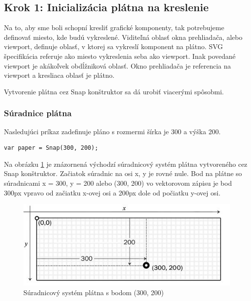  
\subsection{Krok 1: Inicializácia plátna na kreslenie}
Na to, aby sme boli schopní kresliť grafické komponenty, tak potrebujeme definovať miesto, kde budú vykreslené. 
Viditeľná oblasť okna prehliadača, alebo viewport, definuje oblasť, v ktorej sa vykreslí komponent na plátno.
SVG špecifikácia referuje ako miesto vykreslenia seba ako viewport. 
Inak povedané viewport je akákoľvek obdĺžniková oblasť.
Okno prehliadača je referencia na viewport a kresliaca oblasť je plátno.   \cite{Dawber}


Vytvorenie plátna cez Snap konštruktor sa dá urobiť viacerými spôsobmi.

\subsubsection{Súradnice plátna}
 
 
Nasledujúci príkaz zadefinuje pláno s rozmermi šírka je 300 a výška 200. 
\begin{lstlisting}
var paper = Snap(300, 200);
\end{lstlisting}


Na obrázku \ref{fig:suradnice1}  je znázornená východzí súradnicový systém plátna vytvoreného cez Snap konštruktor. 
Začiatok súradnic na osi x, y je rovné nule. Bod na plátne so súradnicami x = 300, y = 200 alebo (300, 200) vo vektorovom zápisu je bod 300px vpravo od začiatku x-ovej osi a 200px dole od počiatku y-ovej osi. 

\begin{center}
	\begin{figure}[hp]
\centering
\includegraphics[width=0.7\linewidth]{obrazky/suradnice1}
\caption{Súradnicový systém plátna s bodom (300, 200)}
\label{fig:suradnice1}
\end{figure}
\end{center}


